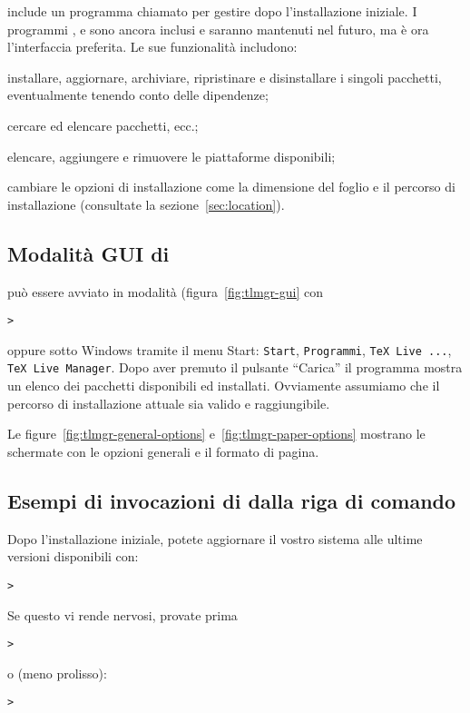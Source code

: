 \documentclass{article}
\begin{document}
\TL{} include un programma chiamato  per gestire \TL{} dopo
l'installazione iniziale. I programmi ,  e
 sono ancora inclusi e saranno mantenuti nel futuro, ma
 è ora l'interfaccia preferita. Le sue funzionalità includono:

\begin{itemize*}
\item installare, aggiornare, archiviare, ripristinare e disinstallare i
  singoli pacchetti, eventualmente tenendo conto delle dipendenze;
\item cercare ed elencare pacchetti, ecc.;
\item elencare, aggiungere e rimuovere le piattaforme disponibili;
\item cambiare le opzioni di installazione come la dimensione del foglio e
  il percorso di installazione (consultate la sezione~\ref{sec:location}).
\end{itemize*}

\subsection{Modalità GUI di }
 può essere avviato in modalità \GUI{}
(figura~\ref{fig:tlmgr-gui} con
\begin{alltt}
> 
\end{alltt}
oppure sotto Windows tramite il menu Start: \texttt{Start},
\texttt{Programmi}, \texttt{TeX Live ...}, \texttt{TeX Live Manager}.
Dopo aver premuto il pulsante ``Carica'' il programma mostra un elenco dei
pacchetti disponibili ed installati. Ovviamente assumiamo che il percorso
di installazione attuale sia valido e raggiungibile.

Le figure~\ref{fig:tlmgr-general-options} e~\ref{fig:tlmgr-paper-options}
mostrano le schermate con le opzioni generali e il formato di pagina.

\subsection{Esempi di invocazioni di  dalla riga di comando}

Dopo l'installazione iniziale, potete aggiornare il vostro sistema alle
ultime versioni disponibili con:
\begin{alltt}
> 
\end{alltt}
Se questo vi rende nervosi, provate prima
\begin{alltt}
> 
\end{alltt}
o (meno prolisso):
\begin{alltt}
> 
\end{alltt}
\end{document}
